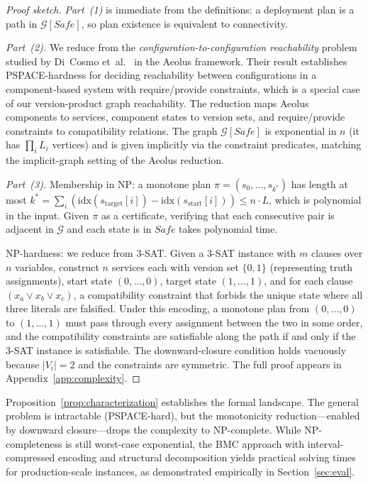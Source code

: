 \documentclass[10pt,twocolumn]{article}
\begin{document}
\begin{proof}[Proof sketch]
\emph{Part~(1)} is immediate from the definitions: a deployment plan is a
path in $\mathcal{G}[\mathit{Safe}]$, so plan existence is equivalent to
connectivity.

\emph{Part~(2).}  We reduce from the \emph{configuration-to-configuration
reachability} problem studied by Di~Cosmo et~al.~\cite{dicosmo-aeolus}
in the Aeolus framework.  Their result establishes
\textsc{PSPACE}-hardness for deciding reachability between configurations
in a component-based system with require/provide constraints, which is a
special case of our version-product graph reachability.  The reduction maps
Aeolus components to services, component states to version sets, and
require/provide constraints to compatibility relations.  The graph
$\mathcal{G}[\mathit{Safe}]$ is exponential in $n$ (it has $\prod_i L_i$
vertices) and is given implicitly via the constraint predicates, matching
the implicit-graph setting of the Aeolus reduction.

\emph{Part~(3).}  Membership in \textsc{NP}: a monotone plan
$\pi = (s_0, \ldots, s_{k^*})$ has length at most
$k^* = \sum_i (\mathrm{idx}(s_{\mathrm{target}}[i]) -
\mathrm{idx}(s_{\mathrm{start}}[i])) \leq n \cdot L$, which is
polynomial in the input.  Given $\pi$ as a certificate, verifying that
each consecutive pair is adjacent in $\mathcal{G}$ and each state is in
$\mathit{Safe}$ takes polynomial time.

\textsc{NP}-hardness: we reduce from \textsc{3-SAT}.  Given a
\textsc{3-SAT} instance with $m$ clauses over $n$ variables, construct $n$
services each with version set $\{0, 1\}$ (representing truth
assignments), start state $(0, \ldots, 0)$, target state $(1, \ldots, 1)$,
and for each clause $(x_a \lor x_b \lor x_c)$, a compatibility constraint
that forbids the unique state where all three literals are falsified.
Under this encoding, a monotone plan from $(0,\ldots,0)$ to
$(1,\ldots,1)$ must pass through every assignment between the two in some
order, and the compatibility constraints are satisfiable along the path if
and only if the \textsc{3-SAT} instance is satisfiable.  The downward-closure
condition holds vacuously because $|V_i| = 2$ and the constraints are
symmetric.  The full proof appears in Appendix~\ref{app:complexity}.
\end{proof}

\noindent
Proposition~\ref{prop:characterization} establishes the formal landscape.
The general problem is intractable (PSPACE-hard), but the monotonicity
reduction---enabled by downward closure---drops the complexity to NP-complete.
While NP-completeness is still worst-case exponential, the BMC approach
with interval-compressed encoding and structural decomposition yields
practical solving times for production-scale instances, as demonstrated
empirically in Section~\ref{sec:eval}.
\end{document}
